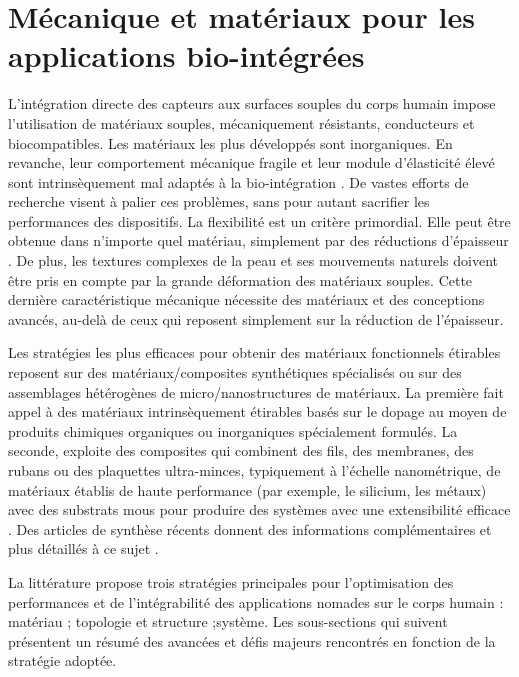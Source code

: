 \section{Mécanique et matériaux pour les applications bio-intégrées}
\label{sec:1.2_Mecanique et materiaux pour les applications bio-integrees}
L'intégration directe des capteurs aux surfaces souples du corps humain impose l'utilisation de matériaux souples, mécaniquement résistants, conducteurs et biocompatibles. Les matériaux les plus développés sont inorganiques. En revanche, leur comportement mécanique fragile et leur module d'élasticité élevé sont intrinsèquement mal adaptés à la bio-intégration \cite{Rogers2010}. De vastes efforts de recherche visent à palier ces problèmes, sans pour autant sacrifier les performances des dispositifs. La flexibilité est un critère primordial. Elle peut être obtenue dans n'importe quel matériau, simplement par des réductions d'épaisseur \cite{Kim2010}. De plus, les textures complexes de la peau et ses mouvements naturels doivent être pris en compte par la grande déformation des matériaux souples. Cette dernière caractéristique mécanique nécessite des matériaux et des conceptions avancés, au-delà de ceux qui reposent simplement sur la réduction de l'épaisseur.

Les stratégies les plus efficaces pour obtenir des matériaux fonctionnels étirables reposent sur des matériaux/composites synthétiques spécialisés ou sur des assemblages hétérogènes de micro/nanostructures de matériaux. La première fait appel à des matériaux intrinsèquement étirables basés sur le dopage au moyen de produits chimiques organiques ou inorganiques spécialement formulés. La seconde, exploite des composites qui combinent des fils, des membranes, des rubans ou des plaquettes ultra-minces, typiquement à l'échelle nanométrique, de matériaux établis de haute performance (par exemple, le silicium, les métaux) avec des substrats mous pour produire des systèmes avec une extensibilité efficace \cite{Ray2019}. Des articles de synthèse récents donnent des informations complémentaires et plus détaillés à ce sujet \cite{Lee2017,Lou2018}. 

La littérature propose trois stratégies principales pour l'optimisation des performances et de l'intégrabilité des applications nomades sur le corps humain : matériau ; topologie et structure ;système. Les sous-sections qui suivent présentent un résumé des avancées et défis majeurs rencontrés en fonction de la stratégie adoptée.
